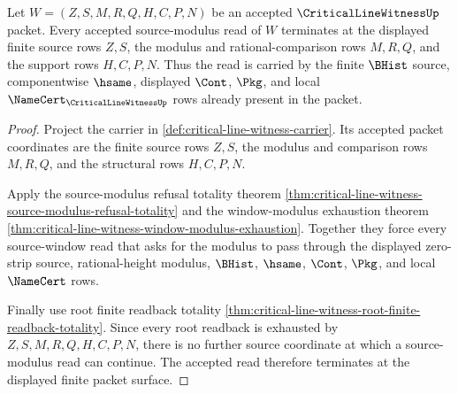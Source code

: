\begin{theorem}
\label{thm:critical-line-witness-source-modulus-terminality}
Let $W=(Z,S,M,R,Q,H,C,P,N)$ be an accepted $\CriticalLineWitnessUp$ packet.
Every accepted source-modulus read of $W$ terminates at the displayed finite
source rows $Z,S$, the modulus and rational-comparison rows $M,R,Q$, and the
support rows $H,C,P,N$. Thus the read is carried by the finite $\BHist$
source, componentwise $\hsame$, displayed $\Cont$, $\Pkg$, and local
$\NameCert_{\CriticalLineWitnessUp}$ rows already present in the packet.
\end{theorem}
\begin{proof}
Project the carrier in \autoref{def:critical-line-witness-carrier}. Its
accepted packet coordinates are the finite source rows $Z,S$, the modulus and
comparison rows $M,R,Q$, and the structural rows $H,C,P,N$.

Apply the source-modulus refusal totality theorem
\autoref{thm:critical-line-witness-source-modulus-refusal-totality} and the
window-modulus exhaustion theorem
\autoref{thm:critical-line-witness-window-modulus-exhaustion}. Together they
force every source-window read that asks for the modulus to pass through the
displayed zero-strip source, rational-height modulus, $\BHist$, $\hsame$,
$\Cont$, $\Pkg$, and local $\NameCert$ rows.

Finally use root finite readback totality
\autoref{thm:critical-line-witness-root-finite-readback-totality}. Since every
root readback is exhausted by $Z,S,M,R,Q,H,C,P,N$, there is no further source
coordinate at which a source-modulus read can continue. The accepted read
therefore terminates at the displayed finite packet surface.
\end{proof}

